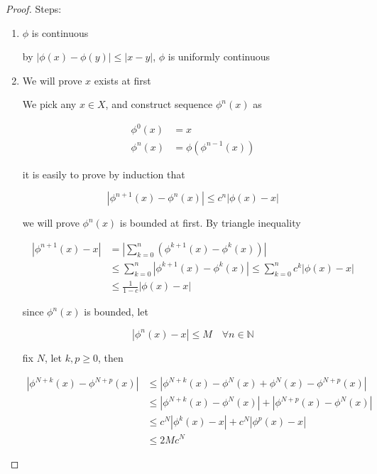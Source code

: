 \begin{proof}
    Steps:


    \begin{enumerate}
        \item $\phi$ is continuous

        by $\left| \phi(x) - \phi(y)\right| \le \left| x- y\right|$, $\phi$ is uniformly continuous
        
        \item     We will prove $x$ exists at first

        We pick any $x \in X$, and construct sequence  $\phi^{n}(x)$ as

        \begin{align*}
            \phi^{0}(x) &= x \\
            \phi^{n}(x) &= \phi(\phi^{n-1}(x)) 
        \end{align*}


        it is easily to prove by induction that

        \[
            \left| \phi^{n+1}(x) - \phi^{n}(x) \right| \le c^n \left| \phi(x) - x \right|
        \]

        we will prove $\phi^n(x)$ is bounded at first. By triangle inequality

        \begin{align*}
            \left| \phi^{n+1}(x) - x\right| &= \left|\sum_{k=0}^{n} \left(\phi^{k+1}(x) - \phi^{k}(x) \right) \right| \\
            & \le \sum_{k=0}^{n} \left|\phi^{k+1}(x) - \phi^{k}(x) \right| \le \sum_{k=0}^{n} c^k \left|\phi(x) - x \right| \\
            & \le \frac{1}{1-c} \left|\phi(x) - x \right|
        \end{align*}

        since $\phi^{n}(x)$ is bounded, let

        \[
            \left| \phi^{n}(x) - x\right| \le M \quad \forall n  \in \mathbb{N}
        \]

        fix $N$, let $k, p \ge 0$, then

        \begin{align*}
            \left| \phi^{N+k}(x) - \phi^{N+p}(x) \right| &\le \left| \phi^{N+k}(x) - \phi^{N}(x) + \phi^{N}(x) - \phi^{N+p}(x) \right| \\
            & \le  \left| \phi^{N+k}(x) - \phi^{N}(x) \right| + \left| \phi^{N+p}(x) - \phi^{N}(x) \right| \\
            & \le c^N\left|  \phi^{k}(x) - x\right| + c^N\left|  \phi^{p}(x) - x\right| \\
            & \le 2M c^N
        \end{align*}


\end{enumerate}
\end{proof}
